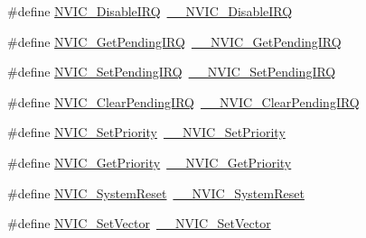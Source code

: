 \begin{DoxyCompactItemize}
\item 
\#define \hyperlink{group___c_m_s_i_s___core___n_v_i_c_functions_ga73b4e251f59cab4e9a5e234aac02ae57}{N\+V\+I\+C\+\_\+\+Disable\+I\+RQ}~\hyperlink{group___c_m_s_i_s___core___n_v_i_c_functions_gae016e4c1986312044ee768806537d52f}{\+\_\+\+\_\+\+N\+V\+I\+C\+\_\+\+Disable\+I\+RQ}
\item 
\#define \hyperlink{group___c_m_s_i_s___core___n_v_i_c_functions_gac608957a239466e9e0cbc30aa64feb3b}{N\+V\+I\+C\+\_\+\+Get\+Pending\+I\+RQ}~\hyperlink{group___c_m_s_i_s___core___n_v_i_c_functions_ga5a92ca5fa801ad7adb92be7257ab9694}{\+\_\+\+\_\+\+N\+V\+I\+C\+\_\+\+Get\+Pending\+I\+RQ}
\item 
\#define \hyperlink{group___c_m_s_i_s___core___n_v_i_c_functions_ga2b47e2e52cf5c48a5c3348636434b3ac}{N\+V\+I\+C\+\_\+\+Set\+Pending\+I\+RQ}~\hyperlink{group___c_m_s_i_s___core___n_v_i_c_functions_gaabefdd4b790b9a7308929938c0c1e1ad}{\+\_\+\+\_\+\+N\+V\+I\+C\+\_\+\+Set\+Pending\+I\+RQ}
\item 
\#define \hyperlink{group___c_m_s_i_s___core___n_v_i_c_functions_ga590cf113000a079b1f0ea3dcd5b5316c}{N\+V\+I\+C\+\_\+\+Clear\+Pending\+I\+RQ}~\hyperlink{group___c_m_s_i_s___core___n_v_i_c_functions_ga562a86dbdf14827d0fee8fdafb04d191}{\+\_\+\+\_\+\+N\+V\+I\+C\+\_\+\+Clear\+Pending\+I\+RQ}
\item 
\#define \hyperlink{group___c_m_s_i_s___core___n_v_i_c_functions_gae0e9d0e2f7b6133828c71b57d4941c35}{N\+V\+I\+C\+\_\+\+Set\+Priority}~\hyperlink{group___c_m_s_i_s___core___n_v_i_c_functions_ga505338e23563a9c074910fb14e7d45fd}{\+\_\+\+\_\+\+N\+V\+I\+C\+\_\+\+Set\+Priority}
\item 
\#define \hyperlink{group___c_m_s_i_s___core___n_v_i_c_functions_gaf59b9d0a791d2157abb319753953eceb}{N\+V\+I\+C\+\_\+\+Get\+Priority}~\hyperlink{group___c_m_s_i_s___core___n_v_i_c_functions_gaeb9dc99c8e7700668813144261b0bc73}{\+\_\+\+\_\+\+N\+V\+I\+C\+\_\+\+Get\+Priority}
\item 
\#define \hyperlink{group___c_m_s_i_s___core___n_v_i_c_functions_ga6aa0367d3642575610476bf0366f0c48}{N\+V\+I\+C\+\_\+\+System\+Reset}~\hyperlink{group___c_m_s_i_s___core___n_v_i_c_functions_ga0d9aa2d30fa54b41eb780c16e35b676c}{\+\_\+\+\_\+\+N\+V\+I\+C\+\_\+\+System\+Reset}
\item 
\#define \hyperlink{group___c_m_s_i_s___core___n_v_i_c_functions_ga804af63bb4c4c317387897431814775d}{N\+V\+I\+C\+\_\+\+Set\+Vector}~\hyperlink{group___c_m_s_i_s___core___n_v_i_c_functions_ga0df355460bc1783d58f9d72ee4884208}{\+\_\+\+\_\+\+N\+V\+I\+C\+\_\+\+Set\+Vector}
\item 

\end{DoxyCompactItemize}
